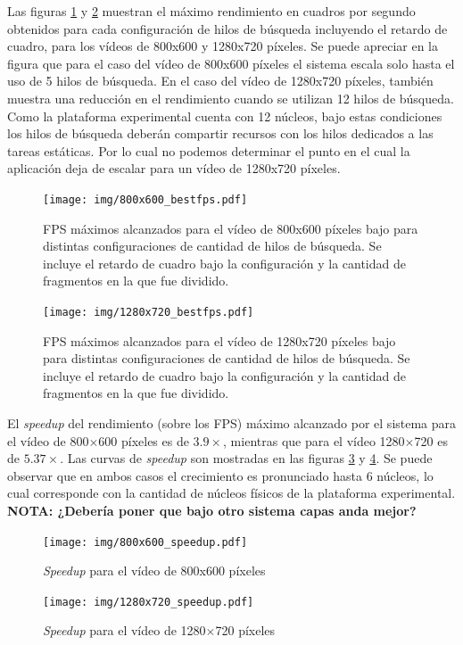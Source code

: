 Las figuras \ref{bestFPS800} y \ref{bestFPS1280} muestran el máximo rendimiento
en cuadros por segundo obtenidos para cada configuración de hilos de búsqueda
incluyendo el retardo de cuadro, para los vídeos de 800x600 y 1280x720 píxeles.
Se puede apreciar en la figura que para el caso del vídeo de 800x600 píxeles el
sistema escala solo hasta el uso de 5 hilos de búsqueda. En el caso del vídeo de
1280x720 píxeles, también muestra una reducción en el rendimiento cuando se
utilizan 12 hilos de búsqueda. Como la plataforma experimental cuenta con 12
núcleos, bajo estas condiciones los hilos de búsqueda deberán compartir recursos
con los hilos dedicados a las tareas estáticas. Por lo cual no podemos
determinar el punto en el cual la aplicación deja de escalar para un vídeo de
1280x720 píxeles.

\begin{figure}[!h]

	\texttt{[image: img/800x600\_bestfps.pdf]}
	\caption{FPS máximos alcanzados para el vídeo de 800x600 píxeles bajo
	para distintas configuraciones de cantidad de hilos de búsqueda. Se
	incluye el retardo de cuadro bajo la configuración y la cantidad de
	fragmentos en la que fue dividido.}
	\label{bestFPS800}

\end{figure}

\begin{figure}[!h]

	\texttt{[image: img/1280x720\_bestfps.pdf]}
	\caption{FPS máximos alcanzados para el vídeo de 1280x720 píxeles bajo
	para distintas configuraciones de cantidad de hilos de búsqueda. Se
	incluye el retardo de cuadro bajo la configuración y la cantidad de
	fragmentos en la que fue dividido.}
	\label{bestFPS1280}

\end{figure}

El \emph{speedup} del rendimiento (sobre los FPS) máximo alcanzado por el
sistema para el vídeo de 800$\times$600 píxeles es de $3.9\times$, mientras que
para el vídeo 1280$\times$720 es de $5.37\times$. Las curvas de \emph{speedup}
son mostradas en las figuras \ref{speedUp800} y \ref{speedUp1280}. Se puede
observar que en ambos casos el crecimiento es pronunciado hasta 6 núcleos, lo
cual corresponde con la cantidad de núcleos físicos de la plataforma
experimental. {\bf NOTA: ¿Debería poner que bajo otro sistema capas anda
mejor?}

\begin{figure}[!h]

	\texttt{[image: img/800x600\_speedup.pdf]}
	\caption{\emph{Speedup} para el vídeo de 800x600 píxeles}
	\label{speedUp800}

\end{figure}

\begin{figure}[!h]

	\texttt{[image: img/1280x720\_speedup.pdf]}
	\caption{\emph{Speedup} para el vídeo de 1280$\times$720 píxeles}
	\label{speedUp1280}

\end{figure}
